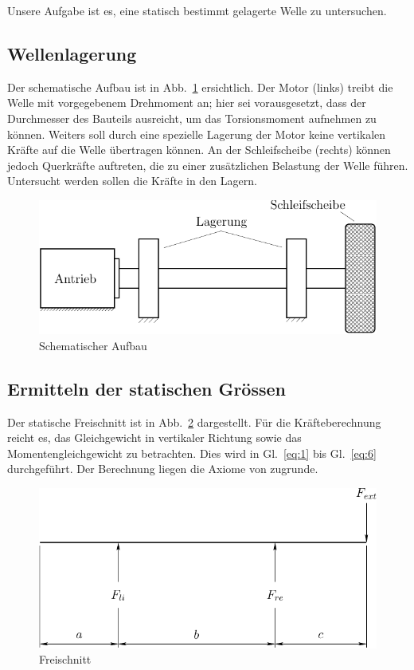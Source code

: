 \documentclass[
a4paper,     %
 headsepline, %
 parskip=half,
 fleqn,       %
12pt         %
]{scrartcl}  %
\begin{document}
Unsere Aufgabe ist es, eine statisch bestimmt gelagerte Welle zu untersuchen.

\subsection{Wellenlagerung}
\label{sec:wellenlagerung}

Der schematische Aufbau ist in Abb.~\ref{fig:schema} ersichtlich. Der Motor (links) treibt die Welle mit vorgegebenem Drehmoment an; hier sei vorausgesetzt, dass der Durchmesser des Bauteils ausreicht, um das Torsionsmoment aufnehmen zu können. Weiters soll durch eine spezielle Lagerung der Motor keine vertikalen Kräfte auf die Welle übertragen können. An der Schleifscheibe (rechts) können jedoch Querkräfte auftreten, die zu einer zusätzlichen Belastung der Welle führen. Untersucht werden sollen die Kräfte in den Lagern. 

\begin{figure}[bt]
  \centering
  \includegraphics{./images/schema}
  \caption[Welle: schematischer Aufbau]{Schematischer Aufbau}
  \label{fig:schema}
\end{figure}


\subsection{Ermitteln der statischen Grössen}
\label{sec:ermitt-der-stat}

Der statische Freischnitt ist in Abb.~\ref{fig:freischnitt} dargestellt. Für die Kräfteberechnung reicht es, das Gleichgewicht in vertikaler Richtung sowie das Momentengleichgewicht zu betrachten. Dies wird in Gl.~\eqref{eq:1} bis Gl.~\eqref{eq:6} durchgeführt. Der Berechnung liegen die Axiome von \cite{newton} zugrunde.

\begin{figure}[bt]
  \centering
  \includegraphics{./images/statik}
  \caption[Welle: statischer Freischnitt]{Freischnitt}
  \label{fig:freischnitt}
\end{figure}
\end{document}
